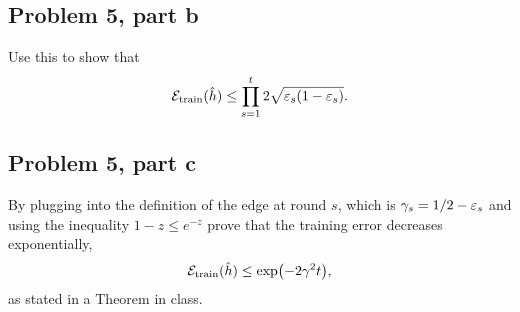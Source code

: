 \subsection{Problem 5, part b}
Use this to show that  
\[\mathcal{E}_{\text{train}}(\hat{h}) \leq \prod_{s = 1}^t 2\sqrt{\varepsilon_s(1 - \varepsilon_s)}.\]

\subsection{Problem 5, part c}
By plugging into the definition of the edge at round $s$, which is $\gamma_s = 1/2 - \varepsilon_s$ and using the inequality $1 - z \leq e^{-z}$ prove that the training error decreases exponentially,
\[\mathcal{E}_{\text{train}}(\hat{h}) \leq \exp(-2\gamma^2t),\]
as stated in a Theorem in class.

